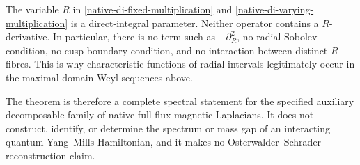 \begin{remark}
The variable \(R\) in
\eqref{native-di-fixed-multiplication} and
\eqref{native-di-varying-multiplication} is a direct-integral parameter.
Neither operator contains a \(R\)-derivative.  In particular, there is no
term such as \(-\partial_R^2\), no radial Sobolev condition, no cusp
boundary condition, and no interaction between distinct \(R\)-fibres.
This is why characteristic functions of radial intervals legitimately
occur in the maximal-domain Weyl sequences above.

The theorem is therefore a complete spectral statement for the specified
auxiliary decomposable family of native full-flux magnetic Laplacians.  It
does not construct, identify, or determine the spectrum or mass gap of an
interacting quantum Yang--Mills Hamiltonian, and it makes no
Osterwalder--Schrader reconstruction claim.
\end{remark}


